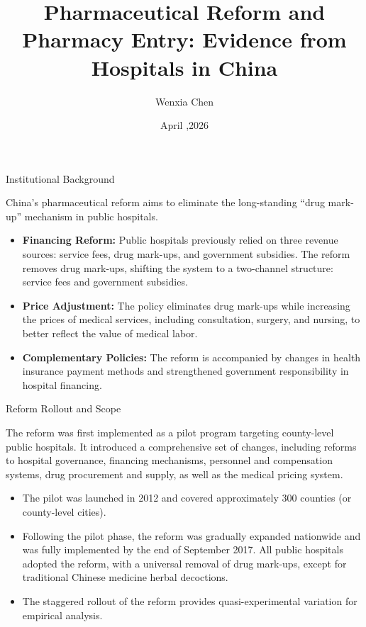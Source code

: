 \documentclass{beamer}
\title{Pharmaceutical Reform and Pharmacy Entry: Evidence from Hospitals in China}
\author{Wenxia Chen}
\date{April ,2026}
\begin{document}


\frame{\titlepage}

\begin{frame}{Institutional Background}

China's pharmaceutical reform aims to eliminate the long-standing 
“drug mark-up” mechanism in public hospitals.

\begin{itemize}
    \item \textbf{Financing Reform:}
    Public hospitals previously relied on three revenue sources:
    service fees, drug mark-ups, and government subsidies. 
    The reform removes drug mark-ups, shifting the system to a 
    two-channel structure: service fees and government subsidies.

    \item \textbf{Price Adjustment:}
    The policy eliminates drug mark-ups while increasing the prices 
    of medical services, including consultation, surgery, and nursing, 
    to better reflect the value of medical labor.

    \item \textbf{Complementary Policies:}
    The reform is accompanied by changes in health insurance payment 
    methods and strengthened government responsibility in hospital financing.
\end{itemize}

\end{frame}

\begin{frame}{Reform Rollout and Scope}


The reform was first implemented as a pilot program targeting county-level public hospitals. It introduced a comprehensive set of changes, including reforms to hospital governance, financing mechanisms, personnel and compensation systems, drug procurement and supply, as well as the medical pricing system.
 \begin{itemize}
 \item The pilot was launched in 2012 and covered approximately 300 counties (or county-level cities).

 \item Following the pilot phase, the reform was gradually expanded nationwide and was fully implemented by the end of September 2017. All public hospitals adopted the reform, with a universal removal of drug mark-ups, except for traditional Chinese medicine herbal decoctions.

\item{The staggered rollout of the reform provides quasi-experimental variation for empirical analysis.}
\end{itemize}

\end{frame}
\end{document}
